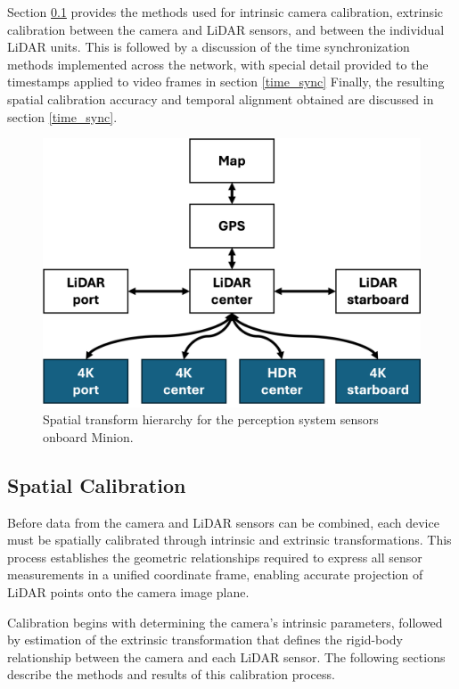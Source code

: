 \documentclass{erauthesis}
\begin{document}
Section \ref{spatial_calibration} provides the methods used for intrinsic camera calibration, extrinsic calibration between the camera and LiDAR sensors, and between the individual LiDAR units. 
This is followed by a discussion of the time synchronization methods implemented across the network, with special detail provided to the timestamps applied to video frames in section \ref{time_sync}
Finally, the resulting spatial calibration accuracy and temporal alignment obtained are discussed in section \ref{time_sync}.



\begin{figure}[htbp]
    \centering
    \includegraphics[width=0.7\linewidth]{Images/tf_tree_1.png}
    \caption{Spatial transform hierarchy for the perception system sensors onboard Minion.}
    \label{fig:tf_tree}
\end{figure}

\subsection{Spatial Calibration} \label{spatial_calibration}

Before data from the camera and \ac{LiDAR} sensors can be combined, each device must be spatially calibrated through intrinsic and extrinsic transformations.  
This process establishes the geometric relationships required to express all sensor measurements in a unified coordinate frame, enabling accurate projection of \ac{LiDAR} points onto the camera image plane.

Calibration begins with determining the camera’s intrinsic parameters, followed by estimation of the extrinsic transformation that defines the rigid-body relationship between the camera and each \ac{LiDAR} sensor.  
The following sections describe the methods and results of this calibration process.
\end{document}
